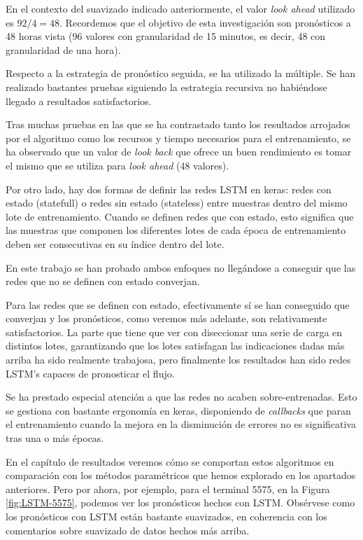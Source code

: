 \documentclass[]{book}
\begin{document}
En el contexto del suavizado indicado anteriormente, el valor \emph{look
ahead} utilizado es \(92/4 = 48\). Recordemos que el objetivo de esta
investigación son pronósticos a 48 horas vista (96 valores con
granularidad de 15 minutos, es decir, 48 con granularidad de una hora).

Respecto a la estrategia de pronóstico seguida, se ha utilizado la
múltiple. Se han realizado bastantes pruebas siguiendo la estrategia
recursiva no habiéndose llegado a resultados satisfactorios.

Tras muchas pruebas en las que se ha contrastado tanto los resultados
arrojados por el algoritmo como los recursos y tiempo necesarios para el
entrenamiento, se ha observado que un valor de \emph{look back} que
ofrece un buen rendimiento es tomar el mismo que se utiliza para
\emph{look ahead} (48 valores).

Por otro lado, hay dos formas de definir las redes LSTM en keras: redes
con estado (statefull) o redes sin estado (stateless) entre muestras
dentro del mismo lote de entrenamiento. Cuando se definen redes que con
estado, esto significa que las muestras que componen los diferentes
lotes de cada época de entrenamiento deben ser consecutivas en su índice
dentro del lote.

En este trabajo se han probado ambos enfoques no llegándose a conseguir
que las redes que no se definen con estado converjan.

Para las redes que se definen con estado, efectivamente sí se han
conseguido que converjan y los pronósticos, como veremos más adelante,
son relativamente satisfactorios. La parte que tiene que ver con
diseccionar una serie de carga en distintos lotes, garantizando que los
lotes satisfagan las indicaciones dadas más arriba ha sido realmente
trabajosa, pero finalmente los resultados han sido redes LSTM's capaces
de pronosticar el flujo.

Se ha prestado especial atención a que las redes no acaben
sobre-entrenadas. Esto se gestiona con bastante ergonomía en keras,
disponiendo de \emph{callbacks} que paran el entrenamiento cuando la
mejora en la disminución de errores no es significativa tras una o más
épocas.

En el capítulo de resultados veremos cómo se comportan estos algoritmos
en comparación con los métodos paramétricos que hemos explorado en los
apartados anteriores. Pero por ahora, por ejemplo, para el terminal
5575, en la Figura \ref{fig:LSTM-5575}, podemos ver los pronósticos
hechos con LSTM. Obsérvese como los pronósticos con LSTM están bastante
suavizados, en coherencia con los comentarios sobre suavizado de datos
hechos más arriba.
\end{document}
